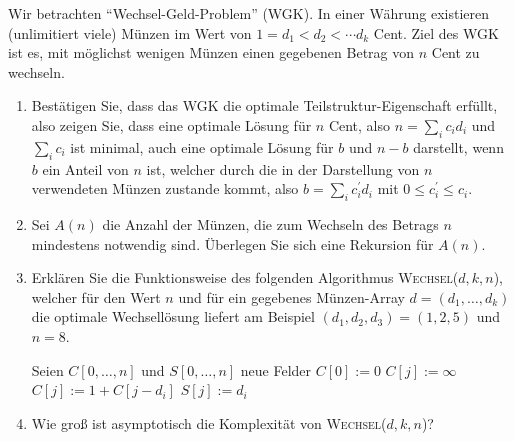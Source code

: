 
\begin{exercise}

Wir betrachten \enquote{Wechsel-Geld-Problem} (WGK).
In einer Währung existieren (unlimitiert viele) Münzen im Wert von $1 = d_1 < d_2 < \cdots  d_k$ Cent.
Ziel des WGK ist es, mit möglichst wenigen Münzen einen gegebenen Betrag von $n$ Cent zu wechseln.

\begin{enumerate}[label = \alph*]

  \item Bestätigen Sie, dass das WGK die optimale Teilstruktur-Eigenschaft erfüllt, also zeigen Sie, dass eine optimale Lösung für $n$ Cent, also $n = \sum_{i} c_i d_i$ und $\sum_i c_i$ ist minimal, auch eine optimale Lösung für $b$ und $n - b$ darstellt, wenn $b$ ein Anteil von $n$ ist, welcher durch die in der Darstellung von $n$ verwendeten Münzen zustande kommt, also $b = \sum_i c_i^\prime d_i$ mit $0 \leq c_i^\prime \leq c_i$.

  \item Sei $A(n)$ die Anzahl der Münzen, die zum Wechseln des Betrags $n$ mindestens notwendig sind.
  Überlegen Sie sich eine Rekursion für $A(n)$.

  \item Erklären Sie die Funktionsweise des folgenden Algorithmus \textsc{Wechsel}($d, k, n$), welcher für den Wert $n$ und für ein gegebenes Münzen-Array $d = (d_1, \dots, d_k)$ die optimale Wechsellösung liefert am Beispiel $(d_1, d_2, d_3) = (1, 2, 5)$ und $n = 8$.
  
  \phantom{}

  \begin{algorithmic}
      \State Seien $C[0, \dots, n]$ und $S[0, \dots, n]$ neue Felder
      \State $C[0] := 0$
        \State $C[j] := \infty$
            \State $C[j] := 1 + C[j - d_i]$
            \State $S[j] := d_i$
          \EndIf
        \EndFor
      \EndFor
    \EndProcedure
  \end{algorithmic}

  \phantom{}

  \item Wie groß ist asymptotisch die Komplexität von \textsc{Wechsel}($d, k, n$)?

\end{enumerate}


\end{exercise}

